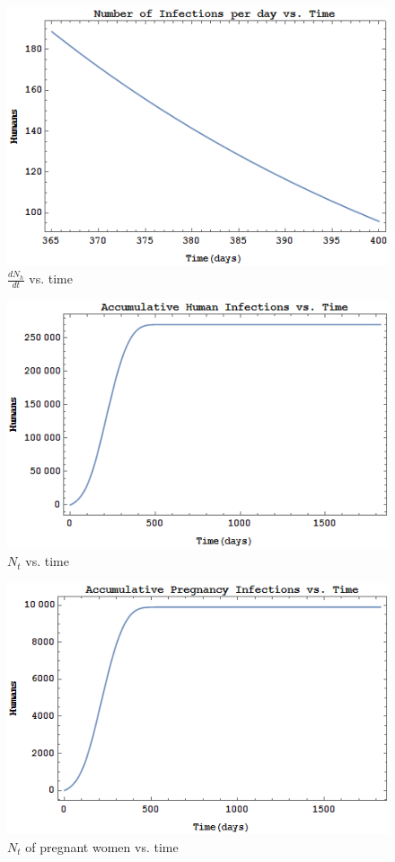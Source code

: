 \documentclass{article}
\begin{document}
\begin{figure}[h!]
  \includegraphics[width=\linewidth]{dNdtVst-tmin=365-tmax=400}
  \caption{$\frac{dN_h}{dt}$ vs. time}
  \label{fig:dndtvst400}
\end{figure}

\begin{figure}[h]
  \includegraphics[width=\linewidth]{ntvst}
  \caption{$N_t$ vs. time}
  \label{fig:ntvst}
\end{figure}

\begin{figure}[h]
  \includegraphics[width=\linewidth]{ntpregvst}
  \caption{$N_t$ of pregnant women vs. time}
  \label{fig:ntpregvst}
\end{figure}
\end{document}

